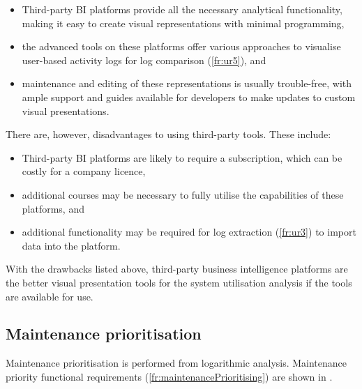 \begin{itemize}
	\item \RaggedRight Third-party BI platforms provide all the necessary analytical functionality, making it easy to create visual representations with minimal programming,
	\item \RaggedRight the advanced tools on these platforms offer various approaches to visualise user-based activity logs for log comparison (\ref{fr:ur5}), and
	\item \RaggedRight maintenance and editing of these representations is usually trouble-free, with ample support and guides available for developers to make updates to custom visual presentations.
\end{itemize}

\clearpage

There are, however, disadvantages to using third-party tools. These include:

\begin{itemize}
	\item \RaggedRight Third-party BI platforms are likely to require a subscription, which can be costly for a company licence,
	\item \RaggedRight additional courses may be necessary to fully utilise the capabilities of these platforms, and
	\item \RaggedRight additional functionality may be required for log extraction (\ref{fr:ur3}) to import data into the platform.
	\end{itemize}

With the drawbacks listed above, third-party business intelligence platforms are the better visual presentation tools for the system utilisation analysis if the tools are available for use.

\subsection{Maintenance prioritisation}\label{sec:ch2_utilisationImprovements}
Maintenance prioritisation is performed from logarithmic analysis. Maintenance priority functional requirements (\ref{fr:maintenancePrioritising}) are shown in .

